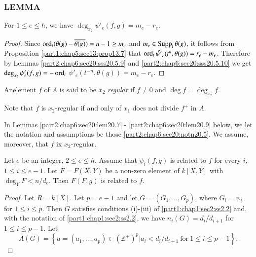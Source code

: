 \subsubsection{LEMMA}\label{part2:chap6:sec20:sss20.5.12}

For $1 \leq e \leq h$, we have $\deg_{x_2} \psi'_e (f, g)= m_e - r_e$.

\begin{proof}
  Since $\operatorname{ord}_t (\theta(g)- \overline{\theta(g)})= n-1 \geq m_e$ and $m_e
  \in \operatorname{Supp}_t \theta (g)$, it follows from
  Proposition \ref{part1:chap5:sec13:prop13.7} that $\operatorname{ord}_t
  \tilde{\psi'}_e (t^n, \theta (g))= r_e - m_e$. Therefore by Lemmas
  \ref{part2:chap6:sec20:sss20.5.9} and
  \ref{part2:chap6:sec20:sss20.5.10} we get $\deg_{x_2} \psi'_e (f,
  g)=- \operatorname{ord}_t$ $\psi'_e (t^{-n}, \theta (g))= m_e - r_e$. 
\end{proof}


\begin{defi}\label{part2:chap6:sec20:def20.6}
 An\pageoriginale element $f$ of $A$ is said to be $x_2$ {\em regular}
 if $f \neq 0$ and $\deg f = \deg_{x_2} f$.
\end{defi}

Note that $f$ is $x_2$-regular if and only of $x_1$ does not divide
$f^+$ in $A$.

In Lemmas \ref{part2:chap6:sec20:lem20.7} -
\ref{part2:chap6:sec20:lem20.9} below, we let the notation and
assumptions be those \ref{part2:chap6:sec20:notn20.5}. We assume,
moreover, that $f$ ix $x_2$-regular.

\begin{lemma}\label{part2:chap6:sec20:lem20.7}
  Let $e$ be an integer, $2 \leq e \leq h$. Assume that $\psi_i (f,
  g)$ is related to $f$ for every $i$, $1 \leq i \leq e-1$. Let $F=
  F(X, Y)$ be a non-zero element of $k[X, Y]$ with $\deg_Y F<
  n/d_e$. Then $F(F, g)$ is related to $f$.
\end{lemma}

\begin{proof}
  Let $R = k[X]$. Let $p= e-1$ and let $G= (G_1 , \ldots , G_p)$,
  where $G_i = \psi_i$ for $1 \leq i \leq p$. Then $G$ satisfies
  conditions (i)-(iii) of \ref{part1:chap1:sec2:ss2.2} and, with the
  notation of \ref{part1:chap1:sec2:ss2.2}, we have $n_i (G) = d_i
  /d_{i+1}$ for $1 \leq i \leq  p-1$. Let
  $$ 
  A(G)=\left\{ a = (a_1, \ldots , a_p) \in (\mathbb{Z}^+)^p \Big| a_i
  < d_i/ d_{i+1} ~\text{for}~ 1 \leq i \leq p-1\right\}.
  $$
\end{proof}

